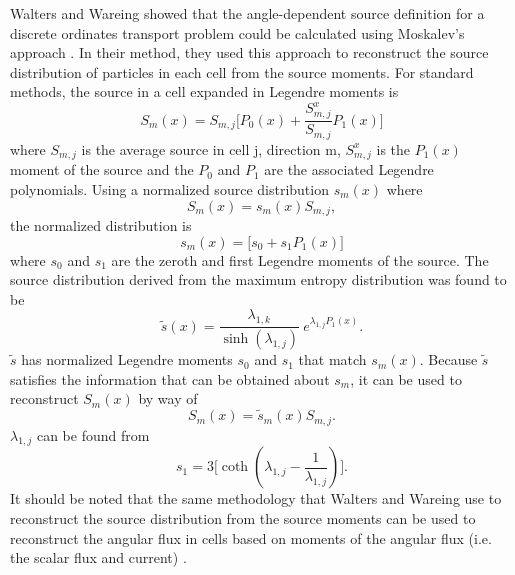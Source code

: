 Walters and Wareing \cite{walters_nonlinear_1994, walters_accurate_1996} showed
that the angle-dependent source definition for a discrete ordinates transport problem
could be calculated using Moskalev's approach
\cite{moskalev_reconstruction_1993}. In their method, they used this approach to
reconstruct the source distribution of particles in each cell from the source
moments. For standard methods, the source in a cell expanded in Legendre moments is
\begin{equation}
  S_m(x) = S_{m,j}\bigg[ P_0(x) + \frac{S_{m,j}^x}{S_{m,j}}P_1(x)\bigg]
\end{equation}
where $S_{m,j}$ is the average source in cell j, direction m, $S_{m,j}^x$ is the
$P_1(x)$ moment of the source and the $P_0$ and $P_1$ are the associated
Legendre polynomials. Using a normalized source distribution $s_m(x)$ where
\begin{equation*}
  S_m(x) = s_m(x) S_{m,j},
\end{equation*}
the normalized distribution is
\begin{equation}
  s_m(x) = \big[ s_0 + s_1 P_1(x)\big]
\end{equation}
where $s_0$ and $s_1$ are the zeroth and first Legendre moments of the source.
The source distribution derived from the maximum entropy distribution was found
to be
\begin{equation}
  \tilde{s}(x) = \frac{\lambda_{1,k}}{\sinh (\lambda_{1,j})} \
  e^{\lambda_{1,j}P_1(x)} .
\end{equation}
$\tilde{s}$ has normalized Legendre moments $s_0$ and $s_1$ that match
$s_m(x)$. Because $\tilde{s}$ satisfies the information that can be obtained
about $s_m$, it can be used to reconstruct $S_m(x)$ by way of
\begin{equation}
  S_m(x) = \tilde{s}_m(x)S_{m,j}.
\label{eq:Walt_reconstruct}
\end{equation}
$\lambda_{1,j}$ can be found from
\begin{equation}
  s_1 = 3\bigg[ \coth(\lambda_{1,j} - \frac{1}{\lambda_{1,j}})\bigg] .
  \label{eq:WW_lambda}
\end{equation}
It should be noted that the same methodology that Walters and Wareing use to reconstruct the source
distribution from the source moments can be used to reconstruct the angular flux
in cells based on moments of the angular flux (i.e. the scalar flux and
current) \cite{walters_nonlinear_1994}.

